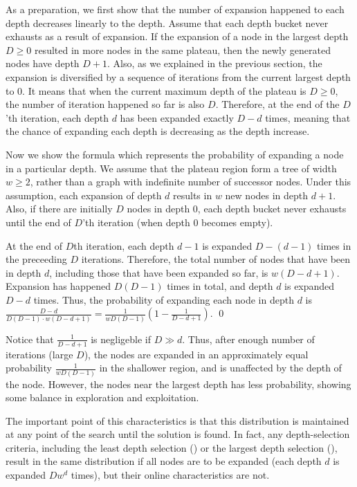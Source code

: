 As a preparation, we first show that the number of expansion happened to each depth decreases
linearly to the depth.
% 
Assume that each depth bucket never exhausts as a result of
expansion.  If the expansion of a node in the largest depth $D\geq 0$ resulted
in more nodes in the same plateau, then the newly generated nodes have
depth $D+1$.  Also, as we explained in the previous section, the
expansion is diversified by a sequence of iterations from the current
largest depth to 0.  It means that when the current maximum depth of
the plateau is $D\geq 0$, the number of iteration happened so far is also $D$.
Therefore, at the end of the $D$'th iteration, each depth $d$ has
been expanded exactly $D-d$ times, meaning that the chance of
expanding each depth is decreasing as the depth increase.

Now we show the formula which represents the probability of expanding a node in a particular depth.
We assume that the plateau region form a tree of width
$w\geq 2$, rather than a graph with indefinite number of successor
nodes.  Under this assumption, each expansion of depth $d$ results in
$w$ new nodes in depth $d+1$. Also, if there are initially
$D$ nodes in depth 0, each depth bucket never exhausts until the end of $D$'th
iteration (when depth 0 becomes empty).

At the end of $D$th iteration,
each depth $d-1$ is expanded $D-(d-1)$ times in the preceeding $D$ iterations.
Therefore, the total number of nodes that have been in depth $d$, including those
that have been expanded so far, is $w(D-d+1)$.
Expansion has happened $D(D-1)$ times in total, and depth $d$ is expanded $D-d$ times.
Thus, the probability of expanding each node in depth $d$ is
$\frac{D-d}{D(D-1)\cdot w(D-d+1)}=\frac{1}{wD(D-1)}(1-\frac{1}{D-d+1})$.  \qed

Notice that $\frac{1}{D-d+1}$ is negligeble if $D \gg d$.
Thus, after enough number of iterations (large $D$), the nodes are 
expanded in an approximately equal probability $\frac{1}{wD(D-1)}$ in the shallower region, and is
unaffected by the depth of the node.
However, the nodes near the largest depth has less probability, showing
some balance in exploration and exploitation.

The important point of this characteristics is that this
distribution is maintained at any point of the search until the solution
is found. In fact, any depth-selection criteria, including the least
depth selection (\fifo) or the largest depth selection (\lifo), 
result in the same distribution if all nodes are to be expanded (each
depth $d$ is expanded $Dw^d$ times), but their
online characteristics are not.
